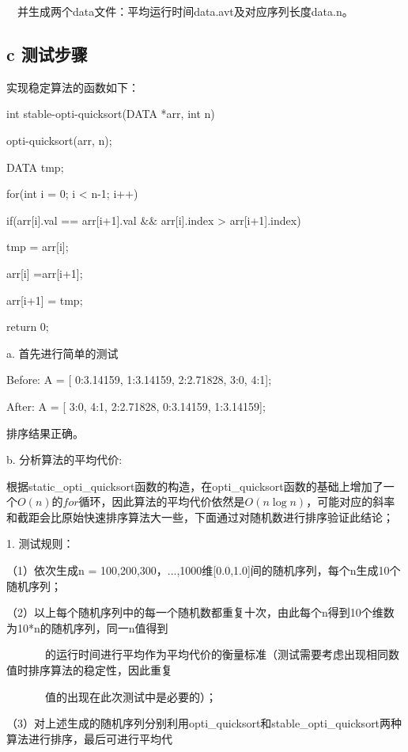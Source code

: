 \documentclass[twoside,a4paper]{article}
\begin{document}
\begin{CJK*}{UTF8}{gkai}
\ \ 并生成两个data文件：平均运行时间data.avt及对应序列长度data.n。

\subsection*{c 测试步骤}
实现稳定算法的函数如下：

  int stable-opti-quicksort(DATA *arr, int n)
  
  {
    
    opti-quicksort(arr, n);
    
    DATA tmp;
    
    for(int i = 0; i < n-1; i++){
      
      if(arr[i].val == arr[i+1].val $ \& \& $ arr[i].index > arr[i+1].index){
        
        tmp = arr[i];
        
        arr[i] =arr[i+1];
        
        arr[i+1] = tmp;
        
      }
      
    }
    
    return 0;
    
}

\noindent a. 首先进行简单的测试

Before: A = [ 0:3.14159, 1:3.14159, 2:2.71828, 3:0, 4:1];
 
After: A = [ 3:0, 4:1, 2:2.71828, 0:3.14159, 1:3.14159];

排序结果正确。

\noindent b. 分析算法的平均代价:
  
根据static\_opti\_quicksort函数的构造，在opti\_quicksort函数的基础上增加了一个$O(n)$的$for$循环，因此算法的平均代价依然是$O(n \log n)$，可能对应的斜率和截距会比原始快速排序算法大一些，下面通过对随机数进行排序验证此结论；
  
  1. 测试规则：

  （1）依次生成n = 100,200,300，...,1000维[0.0,1.0]间的随机序列，每个n生成10个随机序列；
  
  （2）以上每个随机序列中的每一个随机数都重复十次，由此每个n得到10个维数为10*n的随机序列，同一n值得到

  \ \ \ \ \ \ \ 的运行时间进行平均作为平均代价的衡量标准（测试需要考虑出现相同数值时排序算法的稳定性，因此重复

  \ \ \ \ \ \ \ 值的出现在此次测试中是必要的）；
  
  （3）对上述生成的随机序列分别利用opti\_quicksort和stable\_opti\_quicksort两种算法进行排序，最后可进行平均代


\end{CJK*}
\end{document}
